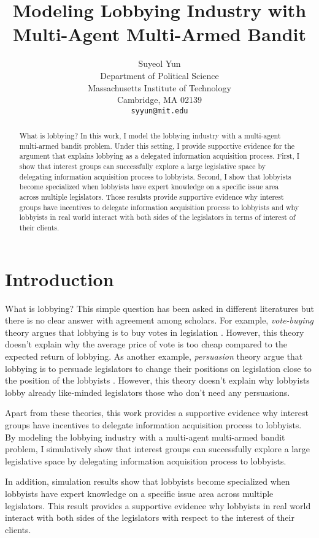 \documentclass{article}
\title{Modeling 
Lobbying Industry with Multi-Agent Multi-Armed Bandit}
\author{%
Suyeol Yun
\\
Department of Political Science\\
Massachusetts Institute of Technology\\
Cambridge, MA 02139 \\
\texttt{syyun@mit.edu} \\
}
\begin{document}
\maketitle
\begin{abstract}
What is lobbying?
In this work, 
I model the lobbying industry 
with a multi-agent multi-armed bandit problem.
Under this setting,
I provide supportive evidence 
for the argument 
that explains lobbying 
as a delegated information acquisition process.
First, I show that 
interest groups can successfully explore 
a large legislative space
by delegating information acquisition process to lobbyists.
Second, I show that 
lobbyists become specialized
when lobbyists have 
expert knowledge on a specific issue area across 
multiple legislators.
Those resulsts  
provide supportive evidence
why interest groups 
have incentives to delegate information acquisition process to lobbyists
and why lobbyists in real world interact with both sides of the legislators in terms of interest of their clients.
\end{abstract}

\section{Introduction}
What is lobbying? 
This simple question has been asked in different literatures but there is no clear answer with agreement among scholars.
For example, \textit{vote-buying} theory argues 
that lobbying is to buy votes in legislation \citep{grossman}. 
However, this theory doesn't explain 
why the average price of vote is too cheap compared 
to the expected return of lobbying.
As another example, \textit{persuasion} 
theory argue that lobbying is to persuade 
legislators to change their positions on legislation close to 
the position of the lobbyists
\citep{truman, Bauer2017, milbrath1984washington}.
However, this theory doesn't 
explain why lobbyists lobby 
already like-minded legislators 
those who don't need any persuasions.

Apart from these theories,
this work 
provides a supportive evidence
why interest groups 
have incentives to delegate information acquisition process to lobbyists.
By modeling the lobbying industry 
with a multi-agent multi-armed bandit problem,
I simulatively show that
interest groups can successfully explore 
a large legislative space by delegating information acquisition process to lobbyists.

In addition, 
simulation results show that 
lobbyists become specialized
when lobbyists have
expert knowledge on a specific issue area across
multiple legislators.
This result provides a supportive evidence
why lobbyists in real world interact 
with both sides of the legislators 
with respect to the interest of their clients.
\end{document}
